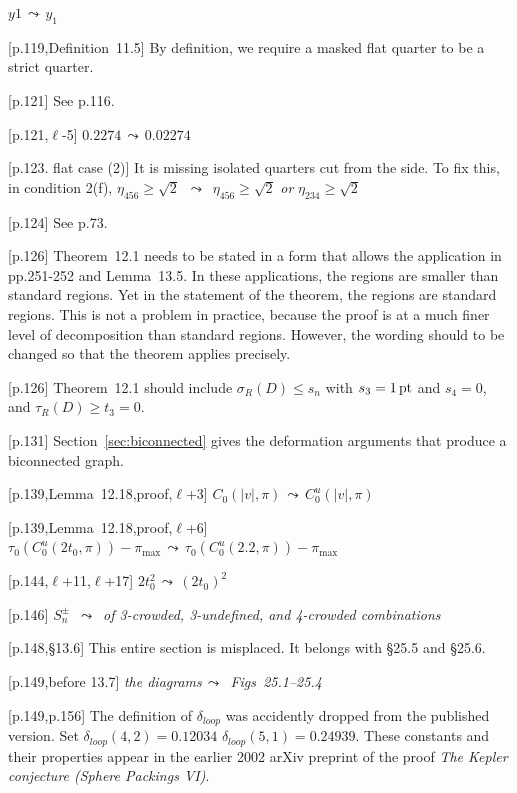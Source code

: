 \documentclass[11pt]{amsart}
\def\op#1{{\text{#1}}}
\def\lto{\ensuremath{\,\leadsto\,}}
\def\line{$\ell$}
\def\text{\hbox}
\def\sz{small} %
\def\rmx{\rm}
\begin{document}
\begin{\sz}
[p.117,Def~11.8]
    $
    y1 \lto y_1
    $
    
 
[p.119,Definition~11.5]  {\rmx By definition, we require a masked flat quarter to
be a strict quarter.}
	
[p.121] {\rmx See p.116.}

[p.121,\line-5]
	$
	0.2274 \lto 0.02274
	$


	
[p.123. flat case (2)]  {\rmx It is missing
isolated quarters cut from the side.
To fix this, in condition 2(f), }
	$
	\eta_{456}\ge\sqrt2$ \lto
	$\eta_{456}\ge\sqrt2$ {\it or } $\eta_{234}\ge\sqrt2$
	
[p.124] {\rmx See p.73. }
	
[p.126]  {\rmx Theorem~12.1 needs to be stated in
a form that allows the application in pp.251-252
and Lemma~13.5.  In these applications, the
regions are smaller than standard regions.
Yet in the statement of the theorem, the regions
are standard regions.  This is not a problem
in practice, because the proof is at a much
finer level of decomposition than standard regions.
However, the wording should to be changed so
that the theorem applies precisely.}


[p.126] 
{\rmx Theorem~12.1 should include $\sigma_R(D)\le s_n$
with $s_3 = 1\,\op{pt}$ and $s_4=0$, and
$\tau_R(D) \ge t_3 = 0$.}

[p.131] {\rmx Section~\ref{sec:biconnected} gives
the deformation arguments that produce a biconnected graph.}


[p.139,Lemma~12.18,proof,\line+3] 
	$C_0(|v|,\pi) \lto
	C_0^u(|v|,\pi)
	$
	
[p.139,Lemma~12.18,proof,\line+6] 
	$
	\tau_0(C_0^u(2t_0,\pi))-\pi_{\max}\lto
	\tau_0(C_0^u(2.2,\pi))-\pi_{\max}
	$

[p.144,\line+11,\line+17]
	$2t_0^2 \lto (2t_0)^2
	$

[p.146]
		$S_n^\pm$ \lto
	{\it of 3-crowded, 3-undefined, and
	4-crowded combinations}

[p.148,\S13.6]  {\rmx This entire
section is misplaced.  It belongs with
\S25.5 and \S25.6.}

[p.149,before 13.7]
{\it the diagrams\lto
	Figs~25.1--25.4}

[p.149,p.156] {\rmx The definition of $\delta_{loop}$ was accidently
dropped from the published version.  Set $\delta_{loop}(4,2)=0.12034 $
$\delta_{loop}(5,1)=0.24939$.  These constants and their properties
appear in the earlier 2002
arXiv preprint of the proof {\it The Kepler conjecture (Sphere Packings VI)}.
}


\end{\sz}
\end{document}
